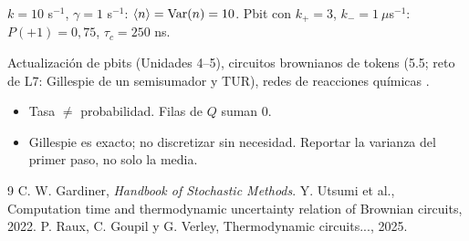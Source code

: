 \documentclass[11pt,a4paper]{article}
\begin{document}
\begin{ejemplo}
$k=10$ s$^{-1}$, $\gamma=1$ s$^{-1}$: $\langle n\rangle=\operatorname{Var}(n)=10$. Pbit con $k_+=3$, $k_-=1\ \mu$s$^{-1}$: $P(+1)=0{,}75$, $\tau_c=250$ ns.
\end{ejemplo}

\begin{aplicacion}
Actualización de pbits (Unidades 4--5), circuitos brownianos de tokens (5.5; reto de L7: Gillespie de un semisumador y TUR), redes de
reacciones químicas \cite{raux}.
\end{aplicacion}

\begin{error}
\begin{itemize}[nosep]
\item Tasa $\neq$ probabilidad. \quad Filas de $Q$ suman 0.
\item Gillespie es exacto; no discretizar sin necesidad. \quad Reportar la varianza del primer paso, no solo la media.
\end{itemize}
\end{error}

\begin{thebibliography}{9}\small
{} C. W. Gardiner, \emph{Handbook of Stochastic Methods}.
 Y. Utsumi et al., Computation time and thermodynamic uncertainty relation of Brownian circuits, 2022.
 P. Raux, C. Goupil y G. Verley, Thermodynamic circuits..., 2025.
\end{thebibliography}
\end{document}
